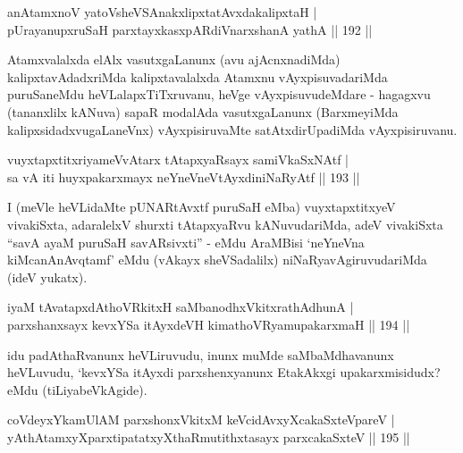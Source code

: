 \begin{shl}
anAtamxnoV yatoV\s sheVSAnakxlipxtatAvxdakalipxtaH |\\
pUrayanupxruSaH parxtayxkasxpARdiVnarxshanA yathA \hfill || 192 ||
\end{shl}

\begin{artha}
Atamxvalalxda elAlx vasutxgaLanunx (avu ajAcnxnadiMda) kalipxtavAdadxriMda kalipxtavalalxda Atamxnu vAyxpisuvadariMda puruSaneMdu heVLalapxTiTxruvanu, heVge vAyxpisuvudeMdare - hagagxvu (tananxlilx kANuva) sapaR modalAda vasutxgaLanunx (BarxmeyiMda kalipxsidadxvugaLaneVnx) vAyxpisiruvaMte satAtxdirUpadiMda vAyxpisiruvanu.
\end{artha}



\begin{shl}
vuyxtapxtitxriyameVvAtarx tAtapxyaRsayx samiVkaSxNAtf |\\
sa vA iti huyxpakarxmayx neYneVneVtAyxdiniNaRyAtf \hfill || 193 ||
\end{shl}

\begin{artha}
I (meVle heVLidaMte pUNARtAvxtf puruSaH eMba) vuyxtapxtitxyeV vivakiSxta, adaralelxV shurxti tAtapxyaRvu kANuvudariMda, adeV vivakiSxta ``savA ayaM puruSaH savARsivxti'' - eMdu AraMBisi `neYneVna kiMcanAnAvqtamf' eMdu (vAkayx sheVSadalilx) niNaRyavAgiruvudariMda (ideV yukatx).
\end{artha}

\begin{shl}
iyaM tAvatapxdAthoVRkitxH saMbanodhxVkitxrathAdhunA |\\
parxshanxsayx kevxYSa itAyxdeVH kimathoVR\s yamupakarxmaH \hfill || 194 ||
\end{shl}

\begin{artha}
idu padAthaRvanunx heVLiruvudu, inunx muMde saMbaMdhavanunx heVLuvudu, `kevxYSa itAyxdi parxshenxyanunx EtakAkxgi upakarxmisidudx? eMdu (tiLiyabeVkAgide).
\end{artha}

\begin{shl}
coVdeyxYkamUlAM parxshonxVkitxM keVcidAvxyXcakaSxteV\s pareV |\\
yAthAtamxyXparxtipatatxyXthaRmutithxtasayx parxcakaSxteV \hfill || 195 ||
\end{shl}

